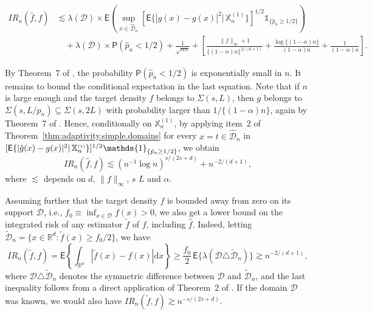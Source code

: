 \documentclass[bj,authoryear]{imsart}
\numberwithin{equation}{section}
\theoremstyle{plain}
\theoremstyle{remark}
\newcommand{\R}{\mathbb{R}}
\newcommand{\PP}{\mathsf{P}}
\newcommand{\EE}{\mathsf{E}}
\newcommand{\1}{\mathds{1}}
\newcommand{\rd}{\mathrm{d}}
\newcommand{\domain}{\mathcal{D}}
\begin{document}
    \begin{equation*}
        \begin{aligned}
            {IR}_n(\hat{f}, f)
            &\lesssim \lambda(\domain) \times \EE\left(\sup_{x\in \hat{\domain}_n} \left[\EE\big\{\left|\hat{g}(x) - g(x)\right|^2 \big| \, \mathbb{X}_n^{(1)}\big\}\right]^{1/2} \1_{\{\hat{p}_n \geq 1 / 2\}}\right) \\
            &\quad+ \lambda(\domain) \times \PP(\hat{p}_n < 1 / 2) + \frac{1}{\sqrt{\alpha n}} + \left[\frac{\|f\|_{\infty}+1}{\{(1 - \alpha) n\}^{2/(d+1)}} + \frac{\log\{(1 - \alpha) n\}}{(1 - \alpha) n} + \frac{1}{(1 - \alpha) n}\right].
        \end{aligned}
    \end{equation*}

    By Theorem~7 of \cite{Brunel2018}, the probability $\PP(\hat{p}_n < 1 / 2)$ is exponentially small in $n$. It remains to bound the conditional expectation in the last equation. Note that if $n$ is large enough and the target density $f$ belongs to $\Sigma(s,L)$, then $g$ belongs to $\Sigma(s,L/p_n)\subseteq \Sigma(s,2L)$ with probability larger than $1/\{(1 - \alpha) n\}$, again by Theorem~7 of \cite{Brunel2018}. Hence, conditionally on $\mathbb{X}_n^{(1)}$, by applying item~2 of Theorem~\ref{thm:adaptivity.simple.domains} for every $x = t\in \hat{\domain}_n$ in $[\EE\{|\hat{g}(x) - g(x)|^2 | \, \smash{\mathbb{X}_n^{\scriptscriptstyle(1)}}\}]^{1/2} \1_{\{\hat{p}_n \geq 1 / 2\}}$, we obtain
    \begin{equation*}
        {IR}_n(\hat{f}, f) \lesssim (n^{-1} \log n)^{s/(2s+d)} + n^{-2/(d+1)},
    \end{equation*}
    where $\lesssim$ depends on $d$, $\|f\|_{\infty}$, $s$ $L$ and $\alpha$.

    Assuming further that the target density $f$ is bounded away from zero on its support $\domain$, i.e., $f_0 \equiv \inf_{x\in \domain} f(x) > 0$, we also get a lower bound on the integrated risk of any estimator $\tilde{f}$ of $f$, including $\hat{f}$. Indeed, letting $\widetilde{\domain}_n = \{x\in \R^d : \tilde{f}(x) \geq f_0 / 2\}$, we have
    \begin{equation*}
        {IR}_n(\tilde{f}, f) = \EE\left\{\int_{\R^d} |\tilde{f}(x) - f(x)| \rd x\right\} \geq \frac{f_0}{2} \, \EE\big\{\lambda(\domain \triangle \widetilde{\domain}_n)\big\} \gtrsim n^{-2/(d+1)},
    \end{equation*}
    where $\domain \triangle \widetilde{\domain}_n$ denotes the symmetric difference between $\domain$ and $\widetilde{\domain}_n$, and the last inequality follows from a direct application of Theorem~2 of \cite{Brunel2018}. If the domain $\domain$ was known, we would also have ${IR}_n(\tilde{f}, f) \gtrsim n^{-s/(2s+d)}$.
\end{document}
